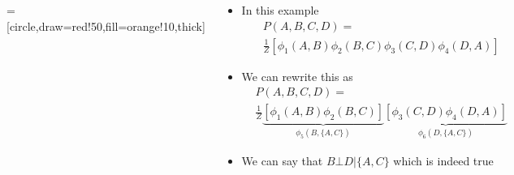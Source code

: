 \begin{frame}
	\begin{columns}
		\begin{overlayarea}{\textwidth}{\textheight}
			\begin{center}
					=[circle,draw=red!50,fill=orange!10,thick]
				\end{center}

		\end{overlayarea}
		\begin{overlayarea}{\textwidth}{\textheight}
			\begin{itemize}[<+->]\justifying
				\item In this example
				\begin{align*}
					&P(A,B,C,D) =\\
					&\frac{1}{Z} [ \phi_1(A,B) \phi_2(B,C) \phi_3(C,D) \phi_4(D,A)]
				\end{align*}
				\item We can rewrite this as 
				\begin{align*}
					&P(A,B,C,D) =\\
					&\frac{1}{Z} \underbrace{[ \phi_1(A,B) \phi_2(B,C) ]}_{\phi_5(B,\{A,C\})} \underbrace{[\phi_3(C,D) \phi_4(D,A)]}_{\phi_6(D,\{A,C\})}
				\end{align*}
				\item We can say that $B \bot D|\{A,C\}$ which is indeed true
			\end{itemize}
		\end{overlayarea}
	\end{columns}
\end{frame}

